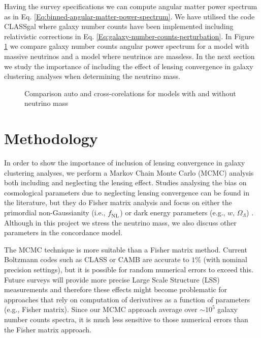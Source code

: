 Having the survey specifications we can compute angular matter power spectrum as in Eq. \eqref{Eq:binned-angular-matter-power-spectrum}. We have utilised the code CLASSgal  where galaxy number counts have been implemented including relativistic corrections in Eq. \eqref{Eq:galaxy-number-counts-perturbation}. In Figure \ref{Fig:comparison-massive-massless-Cls} we compare galaxy number counts angular power spectrum for a model with massive neutrinos and a model where neutrinos are massless. In the next section we study the importance of including the effect of lensing convergence in galaxy clustering analyses when determining the neutrino mass. 

\begin{figure}[hbtp]
\centering
\caption{Comparison auto and cross-corelations for models with and without neutrino mass}
\label{Fig:comparison-massive-massless-Cls}
\end{figure}
 
\section{Methodology}
\label{chapter:7:methodology}

In order to show the importance of inclusion of lensing convergence in galaxy clustering analyses, we perform a Markov Chain Monte Carlo (MCMC) analysis  both including and neglecting the lensing effect. Studies analysing the bias on cosmological parameters due to neglecting lensing convergence can be found in the literature, but they do Fisher matrix analysis and focus on either the primordial non-Gaussianity (i.e., $f_{\rm NL}^{}$)  or dark energy parameters (e.g., $w,\, \Omega_\Lambda$) . Although in this project we stress the neutrino mass, we also discuss other parameters in the concordance model.  

The MCMC technique is more suitable than a Fisher matrix method. Current Boltzmann codes such as CLASS  or CAMB  are accurate to $1\%$ (with nominal precision settings), but it is possible for random numerical errors to exceed this. Future surveys will provide more precise Large Scale Structure (LSS) measurements and therefore these effects might become problematic for approaches that rely on computation of derivatives as a function of parameters (e.g., Fisher matrix). Since our MCMC approach average over $\sim 10^5$ galaxy number counts spectra, it is much less sensitive to those numerical errors than the Fisher matrix approach. 

